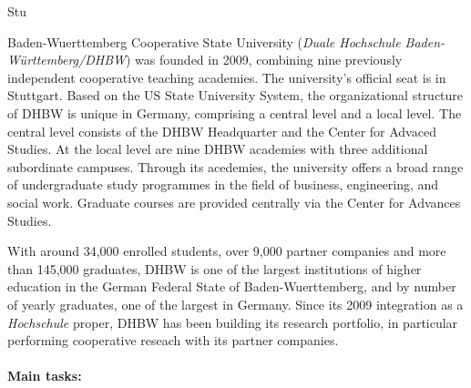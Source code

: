 \begin{sitedescription}{Stu}


Baden-Wuerttemberg Cooperative State University (\emph{Duale
  Hochschule Baden-Württemberg/DHBW}) was founded in 2009, combining
nine previously independent cooperative teaching academies. The
university's official seat is in Stuttgart. Based on the US State
University System, the organizational structure of DHBW is unique in
Germany, comprising a central level and a local level. The central
level consists of the DHBW Headquarter and the Center for Advaced
Studies. At the local level are nine DHBW academies with three
additional subordinate campuses. Through its acedemies, the university
offers a broad range of undergraduate study programmes in the field of
business, engineering, and social work. Graduate courses are provided
centrally via the Center for Advances Studies.


With around 34,000 enrolled students, over 9,000 partner companies and
more than 145,000 graduates, DHBW is one of the largest institutions
of higher education in the German Federal State of Baden-Wuerttemberg,
and by number of yearly graduates, one of the largest in Germany.
Since its 2009 integration as a \emph{Hochschule} proper, DHBW has
been building its research portfolio, in particular performing
cooperative reseach with its partner companies.


\paragraph*{Main tasks:}


\end{sitedescription}
